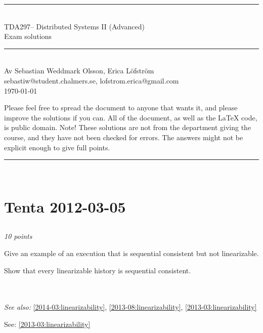 \documentclass[a4paper]{article}
\makeatletter
\newcommand{\coursecode}{TDA297}
\newcommand{\coursename}{Distributed Systems II (Advanced)}
\newcommand{\authorname}{Sebastian Weddmark Olsson, Erica Löfström}
\newcommand{\authormail}{sebastiw@student.chalmers.se, lofstrom.erica@gmail.com}
\newcommand{\doctitle}{Exam solutions}
\newcommand{\horrule}[1]{\rule{\linewidth}{#1}} %
\newcommand{\points}[1]{\subsection{} \textit{#1 points}\\}
\newcommand{\question}[2][]{
  \parbox[t]{\textwidth}{
    \ifthenelse{\equal{#1}{}}{}{#1)}
    \parbox[t]{0.95\textwidth}{#2}}\\}
\newcommand{\seealso}[1]{\\\textit{See also:} #1}
\newcommand{\solution}[2][]{
  \ifthenelse{\equal{#1}{} \or \equal{#1}{a}}{\\[3pt]\textit{Solution: }\\[0.1cm]}{}
  \question[#1]{#2}
}
\makeatother
\begin{document}
\thispagestyle{plain} %
\begin{center}
\horrule{0.5pt} \\[0.3cm] %
%
\huge \coursecode -- \coursename \\[1mm]
\Large \doctitle \\
\normalsize %
\horrule{2pt} \\[0.1cm] %
Av \authorname \\
\authormail\\[0.1cm]
\footnotesize \today\\[0.4cm]
\end{center}
{\footnotesize
Please feel free to spread the document to anyone that wants it, and
please improve the solutions if you can. All of the document, as well
as the \LaTeX{} code, is public domain.
Note! These solutions are not from the department giving the course,
and they have not been checked for errors. The answers might not be
explicit enough to give full points.\\
}
\horrule{0.5pt} %
\normalsize %
\\

\section{Tenta 2012-03-05}

\points{10}
\question{
  Give an example of an execution that is sequential consistent but
  not linearizable.

  Show that every linearizable history is sequential consistent.
}
\seealso{\ref{2014-03:linearizability}, \ref{2013-08:linearizability}, \ref{2013-03:linearizability}}
\solution{See: \ref{2013-03:linearizability}}
\end{document}
